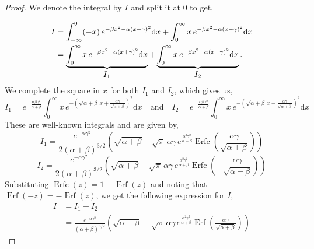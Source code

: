 \documentclass[journal]{IEEEtran}
\theoremstyle{plain}
\theoremstyle{definition}
\theoremstyle{remark}
\newcommand{\Erf}{\operatorname{Erf}}
\newcommand{\Erfc}{\operatorname{Erfc}}
\newcommand{\dd}{\mathrm{d}}
\begin{document}
\begin{proof}
We denote the integral by $I$ and split it at $0$ to get,

\begin{equation}
\begin{split}
    I &= \int_{-\infty}^0 (-x) \, e^{-\beta x^2-\alpha(x-\gamma)^2} \dd x + \int_0^\infty x \, e^{-\beta x^2-\alpha(x-\gamma)^2} \dd x  \\
    &= \underbrace{\int_{0}^\infty x \, e^{-\beta x^2-\alpha(x+\gamma)^2} \dd x}_{\text{\normalsize \(I_1\)}} + \underbrace{\int_0^\infty x \, e^{-\beta x^2-\alpha(x-\gamma)^2} \dd x }_{\text{\normalsize \(I_2\)}}.
\end{split}
\end{equation}
We complete the square in $x$ for both $I_1$ and $I_2$, which gives us,
\begin{equation}
    I_1 = e^{-\frac{\alpha \beta \gamma^2}{\alpha + \beta}} \int_{0}^\infty x \, e^{-\left(\sqrt{\alpha+\beta}\,x + \frac{\alpha \gamma}{\sqrt{\alpha+\beta}}\right)^2} \dd x \quad \text{and} \quad I_2 = e^{-\frac{\alpha \beta \gamma^2}{\alpha + \beta}} \int_{0}^\infty x \, e^{-\left(\sqrt{\alpha+\beta}\,x - \frac{\alpha \gamma}{\sqrt{\alpha+\beta}}\right)^2} \dd x
\end{equation}
These are well-known integrals \cite{owen1980table} and are given by,
\begin{equation}
    I_1 = \frac{e^{-\alpha  \gamma ^2}}{2 (\alpha +\beta )^{3/2}} \left(\sqrt{\alpha +\beta }-\sqrt{\pi } \, \alpha  \gamma \, e^{\frac{\alpha ^2 \gamma ^2}{\alpha +\beta }} \Erfc\left(\frac{\alpha  \gamma }{\sqrt{\alpha +\beta }}\right)\right)
\end{equation}
\begin{equation}
    I_2 = \frac{e^{-\alpha  \gamma ^2}}{2 (\alpha +\beta )^{3/2}} \left(\sqrt{\alpha +\beta } + \sqrt{\pi } \, \alpha  \gamma \, e^{\frac{\alpha ^2 \gamma ^2}{\alpha +\beta }} \Erfc\left(-\frac{\alpha  \gamma }{\sqrt{\alpha +\beta }}\right)\right)
\end{equation}
Substituting $\Erfc(z) = 1 - \Erf(z)$ and noting that $\Erf(-z) = -\Erf(z)$, we get the following expression for $I$,
\begin{equation}
\begin{split}
        I &= I_1 + I_2 \\
        &= \frac{e^{-\alpha  \gamma ^2}}{(\alpha +\beta )^{3/2}} \left(\sqrt{\alpha +\beta } + \sqrt{\pi } \, \alpha  \gamma \, e^{\frac{\alpha ^2 \gamma ^2}{\alpha +\beta }} \Erf \left(\frac{\alpha  \gamma }{\sqrt{\alpha +\beta }}\right)\right) 
\end{split}
\end{equation}
\end{proof}
\end{document}
